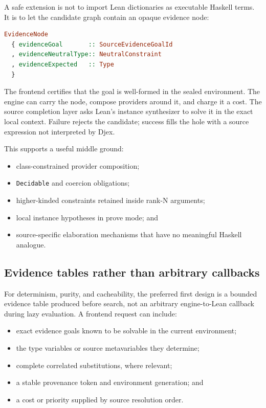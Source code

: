 \documentclass[11pt]{article}
\newcommand{\code}[1]{\texttt{#1}}
\newcommand{\Djex}{\textsf{Djex}}
\begin{document}
A safe extension is not to import Lean dictionaries as executable Haskell
terms.  It is to let the candidate graph contain an opaque evidence node:

\begin{lstlisting}[language=Haskell]
EvidenceNode
  { evidenceGoal       :: SourceEvidenceGoalId
  , evidenceNeutralType:: NeutralConstraint
  , evidenceExpected   :: Type
  }
\end{lstlisting}

The frontend certifies that the goal is well-formed in the sealed environment.
The engine can carry the node, compose providers around it, and charge it a
cost.  The source completion layer asks Lean's instance synthesizer to solve it
in the exact local context.  Failure rejects the candidate; success fills the
hole with a source expression not interpreted by \Djex{}.

This supports a useful middle ground:

\begin{itemize}
  \item class-constrained provider composition;
  \item \code{Decidable} and coercion obligations;
  \item higher-kinded constraints retained inside rank-N arguments;
  \item local instance hypotheses in prove mode; and
  \item source-specific elaboration mechanisms that have no meaningful Haskell
    analogue.
\end{itemize}

\subsection{Evidence tables rather than arbitrary callbacks}

For determinism, purity, and cacheability, the preferred first design is a
bounded evidence table produced before search, not an arbitrary engine-to-Lean
callback during lazy evaluation.  A frontend request can include:

\begin{itemize}
  \item exact evidence goals known to be solvable in the current environment;
  \item the type variables or source metavariables they determine;
  \item complete correlated substitutions, where relevant;
  \item a stable provenance token and environment generation; and
  \item a cost or priority supplied by source resolution order.
\end{itemize}
\end{document}

